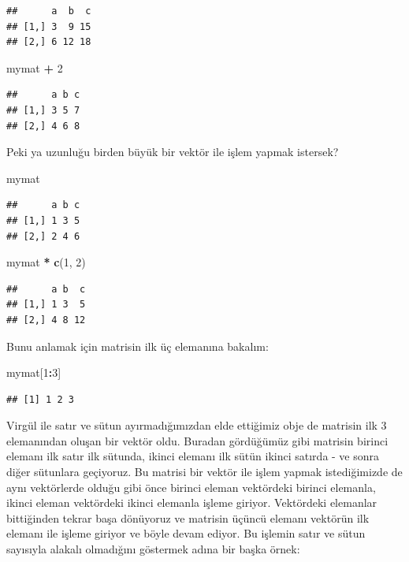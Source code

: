 \documentclass[]{book}
\newenvironment{Shaded}{\begin{snugshade}}{\end{snugshade}}
\newcommand{\DecValTok}[1]{\textcolor[rgb]{0.00,0.00,0.81}{#1}}
\newcommand{\KeywordTok}[1]{\textcolor[rgb]{0.13,0.29,0.53}{\textbf{#1}}}
\newcommand{\NormalTok}[1]{#1}
\newcommand{\OperatorTok}[1]{\textcolor[rgb]{0.81,0.36,0.00}{\textbf{#1}}}
\newcommand{\StringTok}[1]{\textcolor[rgb]{0.31,0.60,0.02}{#1}}
\begin{document}
\begin{verbatim}
##      a  b  c
## [1,] 3  9 15
## [2,] 6 12 18
\end{verbatim}

\begin{Shaded}
\begin{Highlighting}[]
\NormalTok{mymat }\OperatorTok{+}\StringTok{ }\DecValTok{2}
\end{Highlighting}
\end{Shaded}

\begin{verbatim}
##      a b c
## [1,] 3 5 7
## [2,] 4 6 8
\end{verbatim}

Peki ya uzunluğu birden büyük bir vektör ile işlem yapmak istersek?

\begin{Shaded}
\begin{Highlighting}[]
\NormalTok{mymat}
\end{Highlighting}
\end{Shaded}

\begin{verbatim}
##      a b c
## [1,] 1 3 5
## [2,] 2 4 6
\end{verbatim}

\begin{Shaded}
\begin{Highlighting}[]
\NormalTok{mymat }\OperatorTok{*}\StringTok{ }\KeywordTok{c}\NormalTok{(}\DecValTok{1}\NormalTok{, }\DecValTok{2}\NormalTok{)}
\end{Highlighting}
\end{Shaded}

\begin{verbatim}
##      a b  c
## [1,] 1 3  5
## [2,] 4 8 12
\end{verbatim}

Bunu anlamak için matrisin ilk üç elemanına bakalım:

\begin{Shaded}
\begin{Highlighting}[]
\NormalTok{mymat[}\DecValTok{1}\OperatorTok{:}\DecValTok{3}\NormalTok{]}
\end{Highlighting}
\end{Shaded}

\begin{verbatim}
## [1] 1 2 3
\end{verbatim}

Virgül ile satır ve sütun ayırmadığımızdan elde ettiğimiz obje de
matrisin ilk 3 elemanından oluşan bir vektör oldu. Buradan gördüğümüz
gibi matrisin birinci elemanı ilk satır ilk sütunda, ikinci elemanı ilk
sütün ikinci satırda - ve sonra diğer sütunlara geçiyoruz. Bu matrisi
bir vektör ile işlem yapmak istediğimizde de aynı vektörlerde olduğu
gibi önce birinci eleman vektördeki birinci elemanla, ikinci eleman
vektördeki ikinci elemanla işleme giriyor. Vektördeki elemanlar
bittiğinden tekrar başa dönüyoruz ve matrisin üçüncü elemanı vektörün
ilk elemanı ile işleme giriyor ve böyle devam ediyor. Bu işlemin satır
ve sütun sayısıyla alakalı olmadığını göstermek adına bir başka örnek:
\end{document}
